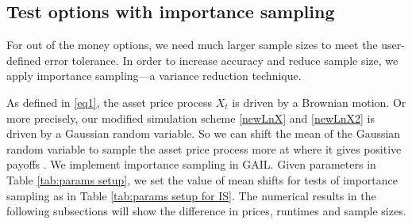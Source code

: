 \documentclass{ws-ijfe}
\begin{document}
\subsection{Test options with importance sampling}

For out of the money options, we need much larger sample sizes to meet the user-defined error tolerance. In order to increase accuracy and reduce sample size, we apply importance sampling---a variance reduction technique.

As defined in \eqref{eq1}, the asset price process $X_t$ is driven by a Brownian motion. Or more precisely, our modified simulation scheme \eqref{newLnX} and \eqref{newLnX2} is driven by a Gaussian random variable. So we can shift the mean of the Gaussian random variable to sample the asset price process more at where it gives positive payoffs \cite{Glasserman2003}.
We implement importance sampling in GAIL. Given parameters in Table \ref{tab:params setup}, we set the value of mean shifts for tests of importance sampling as in Table \ref{tab:params setup for IS}. The numerical results in the following subsections will show the difference in prices, runtimes and sample sizes.
\end{document}
